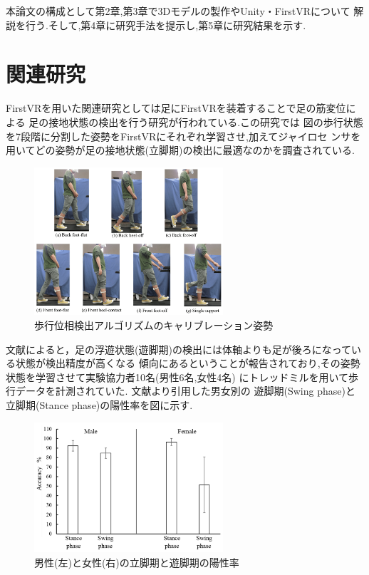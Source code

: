 \documentclass{ltjsreport}
\begin{document}
		本論文の構成として第2章,第3章で3Dモデルの製作やUnity・FirstVRについて
		解説を行う.そして,第4章に研究手法を提示し,第5章に研究結果を示す.

	\section{関連研究}
		FirstVRを用いた関連研究としては足にFirstVRを装着することで足の筋変位による
		足の接地状態の検出を行う研究\cite{ref:6}が行われている.この研究では
		図の歩行状態を7段階に分割した姿勢をFirstVRにそれぞれ学習させ,加えてジャイロセ
		ンサを用いてどの姿勢が足の接地状態(立脚期)の検出に最適なのかを調査されている.
		\begin{figure}[H]
		\centering
		\includegraphics[width = 7cm]{../figs/sensors-21-01081-g004.jpg}
		\caption{歩行位相検出アルゴリズムのキャリブレーション姿勢}
		\label{fig:RR-FVRcalibration}
		\end{figure}

		文献\cite{ref:6}によると，足の浮遊状態(遊脚期)の検出には体軸よりも足が後ろになっている状態が検出精度が高くなる
		傾向にあるということが報告されており,その姿勢状態を学習させて実験協力者10名(男性6名,女性4名)
		にトレッドミルを用いて歩行データを計測されていた.
\clearpage
		文献\cite{ref:6}より引用した男女別の
		遊脚期(Swing phase)と立脚期(Stance phase)の陽性率を図に示す.

		\begin{figure}[H]
		\centering
		\includegraphics[width = 7cm]{../figs/sensors-21-01081-g010.jpg}
		\caption{男性(左)と女性(右)の立脚期と遊脚期の陽性率\\}
		\label{fig:RR-malefemale}
		\end{figure}
\end{document}
